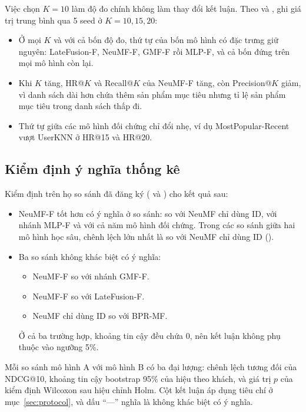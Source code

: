 Việc chọn $K = 10$ làm độ đo chính không làm thay đổi kết luận. Theo  và , ghi giá trị trung bình qua 5 seed ở $K = 10, 15, 20$:
\begin{itemize}
    \item Ở mọi $K$ và với cả bốn độ đo, thứ tự của bốn mô hình có đặc trưng giữ nguyên: LateFusion-F, NeuMF-F, GMF-F rồi MLP-F, và cả bốn đứng trên mọi mô hình còn lại.
    \item Khi $K$ tăng, HR@$K$ và Recall@$K$ của NeuMF-F tăng, còn Precision@$K$ giảm, vì danh sách dài hơn chứa thêm sản phẩm mục tiêu nhưng tỉ lệ sản phẩm mục tiêu trong danh sách thấp đi.
    \item Thứ tự giữa các mô hình đối chứng chỉ đổi nhẹ, ví dụ MostPopular-Recent vượt UserKNN ở HR@15 và HR@20.
\end{itemize}



\subsection{Kiểm định ý nghĩa thống kê}
\label{subsec:multiseed_results}

Kiểm định trên họ  so sánh đã đăng ký ( và ) cho kết quả sau:
\begin{itemize}
    \item NeuMF-F tốt hơn có ý nghĩa ở  so sánh: so với NeuMF chỉ dùng ID, với nhánh MLP-F và với cả năm mô hình đối chứng. Trong các so sánh giữa hai mô hình học sâu, chênh lệch lớn nhất là so với NeuMF chỉ dùng ID ().
    \item Ba so sánh không khác biệt có ý nghĩa:
    \begin{itemize}
        \item NeuMF-F so với nhánh GMF-F.
        \item NeuMF-F so với LateFusion-F.
        \item NeuMF chỉ dùng ID so với BPR-MF.
    \end{itemize}
    Ở cả ba trường hợp, khoảng tin cậy đều chứa 0, nên kết luận không phụ thuộc vào ngưỡng 5\%.
\end{itemize}

Mỗi so sánh mô hình A với mô hình B có ba đại lượng: chênh lệch tương đối của NDCG@10, khoảng tin cậy bootstrap 95\% của hiệu theo khách, và giá trị $p$ của kiểm định Wilcoxon sau hiệu chỉnh Holm. Cột kết luận áp dụng tiêu chí ở mục~\ref{sec:protocol}, và dấu ``---'' nghĩa là không khác biệt có ý nghĩa.

